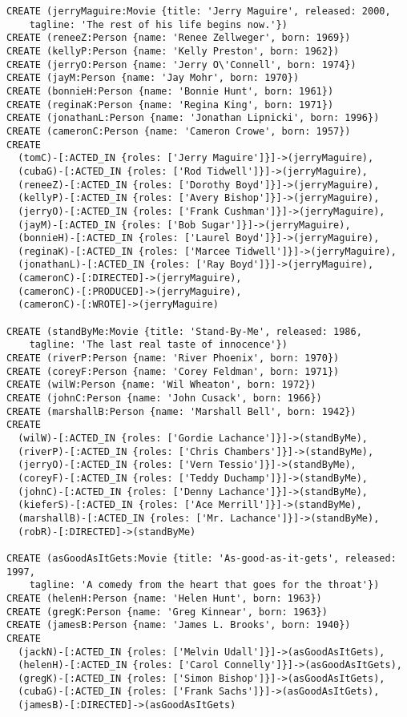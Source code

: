\begin{lstlisting}
CREATE (jerryMaguire:Movie {title: 'Jerry Maguire', released: 2000,
    tagline: 'The rest of his life begins now.'})
CREATE (reneeZ:Person {name: 'Renee Zellweger', born: 1969})
CREATE (kellyP:Person {name: 'Kelly Preston', born: 1962})
CREATE (jerryO:Person {name: 'Jerry O\'Connell', born: 1974})
CREATE (jayM:Person {name: 'Jay Mohr', born: 1970})
CREATE (bonnieH:Person {name: 'Bonnie Hunt', born: 1961})
CREATE (reginaK:Person {name: 'Regina King', born: 1971})
CREATE (jonathanL:Person {name: 'Jonathan Lipnicki', born: 1996})
CREATE (cameronC:Person {name: 'Cameron Crowe', born: 1957})
CREATE
  (tomC)-[:ACTED_IN {roles: ['Jerry Maguire']}]->(jerryMaguire),
  (cubaG)-[:ACTED_IN {roles: ['Rod Tidwell']}]->(jerryMaguire),
  (reneeZ)-[:ACTED_IN {roles: ['Dorothy Boyd']}]->(jerryMaguire),
  (kellyP)-[:ACTED_IN {roles: ['Avery Bishop']}]->(jerryMaguire),
  (jerryO)-[:ACTED_IN {roles: ['Frank Cushman']}]->(jerryMaguire),
  (jayM)-[:ACTED_IN {roles: ['Bob Sugar']}]->(jerryMaguire),
  (bonnieH)-[:ACTED_IN {roles: ['Laurel Boyd']}]->(jerryMaguire),
  (reginaK)-[:ACTED_IN {roles: ['Marcee Tidwell']}]->(jerryMaguire),
  (jonathanL)-[:ACTED_IN {roles: ['Ray Boyd']}]->(jerryMaguire),
  (cameronC)-[:DIRECTED]->(jerryMaguire),
  (cameronC)-[:PRODUCED]->(jerryMaguire),
  (cameronC)-[:WROTE]->(jerryMaguire)

CREATE (standByMe:Movie {title: 'Stand-By-Me', released: 1986,
    tagline: 'The last real taste of innocence'})
CREATE (riverP:Person {name: 'River Phoenix', born: 1970})
CREATE (coreyF:Person {name: 'Corey Feldman', born: 1971})
CREATE (wilW:Person {name: 'Wil Wheaton', born: 1972})
CREATE (johnC:Person {name: 'John Cusack', born: 1966})
CREATE (marshallB:Person {name: 'Marshall Bell', born: 1942})
CREATE
  (wilW)-[:ACTED_IN {roles: ['Gordie Lachance']}]->(standByMe),
  (riverP)-[:ACTED_IN {roles: ['Chris Chambers']}]->(standByMe),
  (jerryO)-[:ACTED_IN {roles: ['Vern Tessio']}]->(standByMe),
  (coreyF)-[:ACTED_IN {roles: ['Teddy Duchamp']}]->(standByMe),
  (johnC)-[:ACTED_IN {roles: ['Denny Lachance']}]->(standByMe),
  (kieferS)-[:ACTED_IN {roles: ['Ace Merrill']}]->(standByMe),
  (marshallB)-[:ACTED_IN {roles: ['Mr. Lachance']}]->(standByMe),
  (robR)-[:DIRECTED]->(standByMe)

CREATE (asGoodAsItGets:Movie {title: 'As-good-as-it-gets', released: 1997,
    tagline: 'A comedy from the heart that goes for the throat'})
CREATE (helenH:Person {name: 'Helen Hunt', born: 1963})
CREATE (gregK:Person {name: 'Greg Kinnear', born: 1963})
CREATE (jamesB:Person {name: 'James L. Brooks', born: 1940})
CREATE
  (jackN)-[:ACTED_IN {roles: ['Melvin Udall']}]->(asGoodAsItGets),
  (helenH)-[:ACTED_IN {roles: ['Carol Connelly']}]->(asGoodAsItGets),
  (gregK)-[:ACTED_IN {roles: ['Simon Bishop']}]->(asGoodAsItGets),
  (cubaG)-[:ACTED_IN {roles: ['Frank Sachs']}]->(asGoodAsItGets),
  (jamesB)-[:DIRECTED]->(asGoodAsItGets)


\end{lstlisting}
